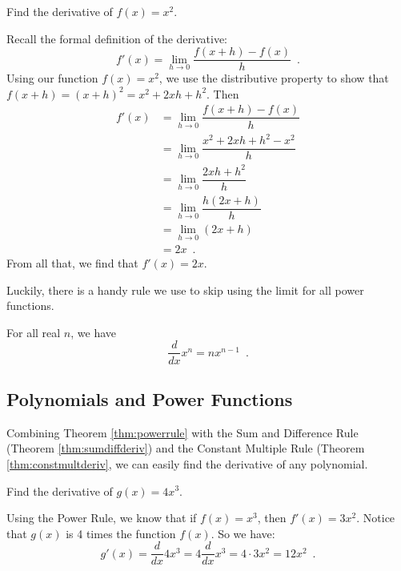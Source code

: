 \begin{example}
Find the derivative of $f(x)=x^2$.

\begin{solution} Recall the formal definition of the derivative:
$$f'(x)=\lim_{h\to 0} \dfrac{f(x+h)-f(x)}{h} \enspace .$$
Using our function $f(x)=x^2$, we use the distributive property to show that $f(x+h)=(x+h)^2=x^2+2xh+h^2$. Then
\begin{align*}
			f'(x) &= \lim_{h\to 0} \dfrac{f(x+h)-f(x)}{h}\\
			 &= \lim_{h\to 0} \dfrac{x^2+2xh+h^2-x^2}{h}\\
			 &= \lim_{h\to 0} \dfrac{2xh+h^2}{h}\\
			 &= \lim_{h\to 0} \dfrac{h(2x+h)}{h}\\
			 &= \lim_{h\to 0} (2x+h)\\
			 &= 2x \enspace .
		\end{align*}
From all that, we find that $f'(x)=2x$.
\end{solution}\end{example}

Luckily, there is a handy rule we use to skip using the limit for all power functions.

\begin{theorem}
\label{thm:powerrule}
For all real $n$, we have
$$\dfrac{d}{dx}x^n = nx^{n-1} \enspace .$$
\end{theorem}

\subsection{Polynomials and Power Functions}

Combining Theorem \ref{thm:powerrule} with the Sum and Difference Rule (Theorem \ref{thm:sumdiffderiv}) and the Constant Multiple Rule (Theorem \ref{thm:constmultderiv}, we can easily find the derivative of any polynomial. 

\begin{example}
Find the derivative of $g(x)=4x^3$.

\begin{solution} Using the Power Rule, we know that if $f(x)=x^3$, then $f'(x)=3x^2$. Notice that $g(x)$ is 4 times the function $f(x)$. So we have:
$$g'(x) = \dfrac{d}{dx}4x^3 = 4\dfrac{d}{dx}x^3 = 4\cdot 3x^2=12x^2 \enspace .$$
\end{solution}\end{example}

